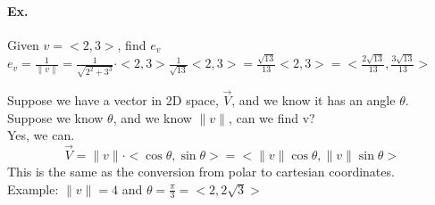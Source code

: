 \documentclass[]{article}
\begin{document}
    \paragraph*{Ex.} Given $v=<2,3>$, find $e_v$\\
    $e_v=\frac{1}{\lVert v \rVert} = \frac{1}{\sqrt{2^2+3^3}} \cdot <2,3> \frac{1}{\sqrt{13}}<2,3> = \frac{\sqrt{13}}{13}<2,3> = <\frac{2\sqrt{13}}{13}, \frac{3\sqrt{13}}{13}>$


    Suppose we have a vector in 2D space, $\overrightarrow{V}$, and we know it has an angle $\theta$.\\
    Suppose we know $\theta$, and we know $\lVert v \rVert$, can we find v?\\
    Yes, we can.\\
    \begin{equation*}
        \overrightarrow{V} = \lVert v \rVert \cdot <\cos \theta, \sin \theta> = <\lVert v \rVert \cos \theta, \lVert v \rVert \sin \theta>
    \end{equation*}
    This is the same as the conversion from polar to cartesian coordinates.\\

    Example:
    $\lVert v \rVert = 4$ and $\theta = \frac{\pi}{3} = <2, 2\sqrt{3}>$\\
    
\end{document}
